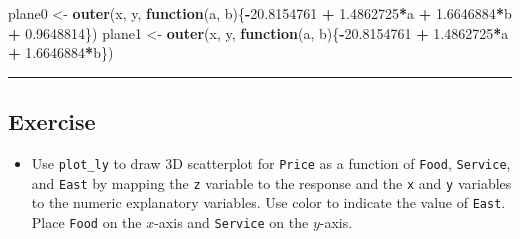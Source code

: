 \documentclass[
]{book}
\newenvironment{Shaded}{\begin{snugshade}}{\end{snugshade}}
\newcommand{\CommentTok}[1]{\textcolor[rgb]{0.56,0.35,0.01}{\textit{#1}}}
\newcommand{\ControlFlowTok}[1]{\textcolor[rgb]{0.13,0.29,0.53}{\textbf{#1}}}
\newcommand{\DataTypeTok}[1]{\textcolor[rgb]{0.13,0.29,0.53}{#1}}
\newcommand{\FloatTok}[1]{\textcolor[rgb]{0.00,0.00,0.81}{#1}}
\newcommand{\KeywordTok}[1]{\textcolor[rgb]{0.13,0.29,0.53}{\textbf{#1}}}
\newcommand{\NormalTok}[1]{#1}
\newcommand{\OperatorTok}[1]{\textcolor[rgb]{0.81,0.36,0.00}{\textbf{#1}}}
\newcommand{\StringTok}[1]{\textcolor[rgb]{0.31,0.60,0.02}{#1}}
\providecommand{\tightlist}{%
  \setlength{\itemsep}{0pt}\setlength{\parskip}{0pt}}
\begin{document}
\begin{Shaded}
\begin{Highlighting}[]
\NormalTok{plane0 <-}\StringTok{ }\KeywordTok{outer}\NormalTok{(x, y, }\ControlFlowTok{function}\NormalTok{(a, b)\{}\OperatorTok{-}\FloatTok{20.8154761} \OperatorTok{+}\StringTok{ }\FloatTok{1.4862725}\OperatorTok{*}\NormalTok{a }\OperatorTok{+}\StringTok{ }\FloatTok{1.6646884}\OperatorTok{*}\NormalTok{b }\OperatorTok{+}\StringTok{ }\FloatTok{0.9648814}\NormalTok{\})}
\NormalTok{plane1 <-}\StringTok{ }\KeywordTok{outer}\NormalTok{(x, y, }\ControlFlowTok{function}\NormalTok{(a, b)\{}\OperatorTok{-}\FloatTok{20.8154761} \OperatorTok{+}\StringTok{ }\FloatTok{1.4862725}\OperatorTok{*}\NormalTok{a }\OperatorTok{+}\StringTok{ }\FloatTok{1.6646884}\OperatorTok{*}\NormalTok{b\})}
\end{Highlighting}
\end{Shaded}

\begin{center}\rule{0.5\linewidth}{0.5pt}\end{center}

\hypertarget{exercise-24}{%
\subsection*{Exercise}\label{exercise-24}}

\begin{itemize}
\tightlist
\item
  Use \texttt{plot\_ly} to draw 3D scatterplot for \texttt{Price} as a function of \texttt{Food}, \texttt{Service}, and \texttt{East} by mapping the \texttt{z} variable to the response and the \texttt{x} and \texttt{y} variables to the numeric explanatory variables. Use color to indicate the value of \texttt{East}. Place \texttt{Food} on the \(x\)-axis and \texttt{Service} on the \(y\)-axis.
\end{itemize}

\begin{Shaded}
\end{Shaded}
\end{document}
